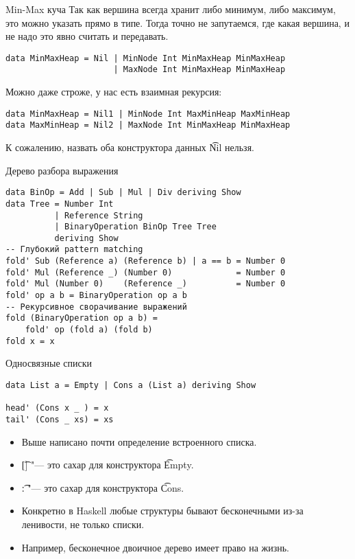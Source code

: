 \begin{frame}[fragile]{Min-Max куча}
	Так как вершина всегда хранит либо минимум, либо максимум, это можно указать прямо в типе.
	Тогда точно не запутаемся, где какая вершина, и не надо это явно считать и передавать.
\begin{verbatim}
data MinMaxHeap = Nil | MinNode Int MinMaxHeap MinMaxHeap
                      | MaxNode Int MinMaxHeap MinMaxHeap
\end{verbatim}
	Можно даже строже, у нас есть взаимная рекурсия:
\begin{verbatim}
data MinMaxHeap = Nil1 | MinNode Int MaxMinHeap MaxMinHeap
data MaxMinHeap = Nil2 | MaxNode Int MinMaxHeap MinMaxHeap
\end{verbatim}	
	К сожалению, назвать оба конструктора данных \t{Nil} нельзя.
\end{frame}

\begin{frame}[fragile]{Дерево разбора выражения}
\begin{verbatim}
data BinOp = Add | Sub | Mul | Div deriving Show
data Tree = Number Int
          | Reference String
          | BinaryOperation BinOp Tree Tree
          deriving Show
-- Глубокий pattern matching
fold' Sub (Reference a) (Reference b) | a == b = Number 0
fold' Mul (Reference _) (Number 0)             = Number 0
fold' Mul (Number 0)    (Reference _)          = Number 0
fold' op a b = BinaryOperation op a b
-- Рекурсивное сворачивание выражений
fold (BinaryOperation op a b) =
    fold' op (fold a) (fold b)
fold x = x
\end{verbatim}
\end{frame}

\begin{frame}[fragile]{Односвязные списки}
\begin{verbatim}
data List a = Empty | Cons a (List a) deriving Show

head' (Cons x _ ) = x
tail' (Cons _ xs) = xs
\end{verbatim}
	\begin{itemize}
		\item Выше написано почти определение встроенного списка.
		\item \t{[]} "--- это сахар для конструктора \t{Empty}.
		\item \t{:} "--- это сахар для конструктора \t{Cons}.
		\item Конкретно в Haskell любые структуры бывают бесконечными из-за ленивости, не только списки.
		\item Например, бесконечное двоичное дерево имеет право на жизнь.
	\end{itemize}
\end{frame}

